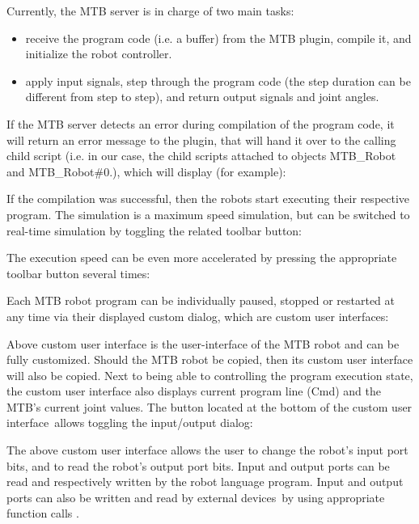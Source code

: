 Currently, the MTB server is in charge of two main tasks:
\begin{itemize}[nosep]
	\item receive the program code (i.e. a buffer) from the MTB plugin, 
		compile it, and initialize the robot controller.
	\item apply input signals, step through the program code (the step 
		duration can be different from step to step), and return output 
		signals and joint angles.
\end{itemize}

If the MTB server detects an error during compilation of the program code, 
it will return an error message to the plugin, that will hand it over to the 
calling child script (i.e. in our case, the child scripts attached to 
objects MTB\_Robot and MTB\_Robot\#0.), which will display (for example):


If the compilation was successful, then the robots start executing their 
respective program. The simulation is a maximum speed simulation, but can 
be switched to real-time simulation by toggling the related toolbar button:


The execution speed can be even more accelerated by pressing the appropriate
toolbar button several times:


Each MTB robot program can be individually paused, stopped or restarted at 
any time via their displayed custom dialog, which are custom user interfaces:


Above custom user interface is the user-interface of the MTB robot and can 
be fully customized. Should the MTB robot be copied, then its custom user 
interface will also be copied. Next to being able to controlling the program
execution state, the custom user interface also displays current program 
line (Cmd) and the MTB's current joint values. The button located at the 
bottom of the custom user interface\ allows toggling
the input/output dialog:


The above custom user interface allows the user to change the robot's input 
port bits, and to read the robot's output port bits. Input and output ports
can be read and respectively written by the robot language program. Input 
and output ports can also be written and read by external devices\ by using appropriate function calls
.

